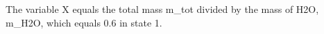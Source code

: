 The variable X equals the total mass m_tot divided by the mass of H2O, m_H2O, which equals 0.6 in state 1.